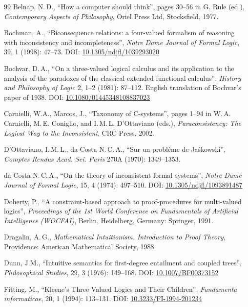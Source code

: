 \documentclass[11pt,a4paper,titlepage]{article}
\theoremstyle{definition}
\newcommand{\3}{\vspace{.3in}}
\newcommand{\2}{\vspace{.2in}}
\newcommand{\1}{\vspace{.1in}}
\newcommand{\5}{\vspace{.05in}}
\newcommand\DOI[2]{DOI: \href{#1#2}{#2}}
\newcommand{\ts}{\,}
\begin{document}
\begin{thebibliography}{99}
 Belnap, N.\ts D., ``How a computer should think'', pages 30--56 in G. Rule (ed.), \textit{Contemporary Aspects of Philosophy}, Oriel Press Ltd, Stocksfield, 1977.


Bochman, A., ``Biconsequence relations: a four-valued formalism of reasoning with inconsistency and incompleteness'', \textit{Notre Dame Journal of Formal Logic}, 39, 1 (1998): 47--73. 
\DOI{http://dx.doi.org/}{10.1305/ndjfl/1039293020}

 Bochvar, D.\ts A., ``On a three-valued logical calculus and its application to the analysis of the paradoxes of the classical extended functional calculus'', \textit{History and Philosophy of Logic} 2, 1--2 (1981): 87--112. English translation of Bochvar's paper of 1938. \DOI{http://dx.doi.org/}{10.1080/01445348108837023}

Carnielli, W.A., Marcos, J., ``Taxonomy of C-systems'', pages 1--94 in W.\ts A. Carnielli, M.\ts E. Coniglio, and I.\ts M.\ts L. D'Ottaviano (eds.),  \textit{Paraconsistency: The Logical Way to the Inconsistent}, CRC Press, 2002.

D'Ottaviano, I.\ts M.\ts L., da Costa N.\ts C.\ts A., ``Sur un probl\'{e}me de Ja\'{s}kowski'',  \textit{Comptes Rendus Acad. Sci. Paris} 270A (1970): 1349--1353.

da Costa N.\ts C.\ts A., ``On the theory of inconsistent formal systems'', \textit{Notre Dame Journal of Formal Logic}, 15, 4 (1974): 497--510.
\DOI{http://dx.doi.org/}{10.1305/ndjfl/1093891487}

Doherty, P., ``A constraint-based approach to proof-procedures for multi-valued logics'',
\textit{Proceedings of the 1st World Conference on Fundamentals of Artificial Intelligence (WOCFAI)}, Berlin, Heidelberg, Germany: Springer, 1991.

Dragalin, A.\ts G., \textit{Mathematical Intuitionism. Introduction to Proof
Theory}, Providence: American Mathematical Society, 1988.

Dunn, J.M., ``Intuitive semantics for first-degree entailment and coupled trees'', \textit{Philosophical Studies}, 29, 3 (1976): 149--168.
\DOI{http://dx.doi.org/}{10.1007/BF00373152}

Fitting, M., ``Kleene's Three Valued Logics and Their Children'', \textit{Fundamenta informaticae},  20, 1 (1994): 113--131.
\DOI{http://dx.doi.org/}{10.3233/FI-1994-201234}


\end{thebibliography}
\end{document}

